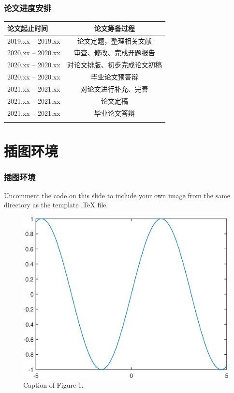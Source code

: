\documentclass[notheorems,11pt,compress]{beamer}
\numberwithin{figure}{section}
\numberwithin{table}{section}
\numberwithin{equation}{section}
\theoremstyle{plain}
\numberwithin{theorem}{section}
\numberwithin{lemma}{section}
\numberwithin{corollary}{section}
\numberwithin{definition}{section}
\numberwithin{proposition}{section}
\theoremstyle{example}
\begin{document}

\begin{frame}
\frametitle{论文进度安排}
\begin{table}[htp!]
\centering
\renewcommand\arraystretch{1.3} %
\begin{tabularx}{0.92\textwidth}{|P{3.2cm}|C|}
\Xhline{2\arrayrulewidth}
论文起止时间       &  论文筹备过程\\
\hline
2019.xx -- 2019.xx    &  论文定题，整理相关文献\\
\hline
2020.xx -- 2020.xx    &  审查、修改、完成开题报告\\
\hline
2020.xx -- 2020.xx   &  对论文排版、初步完成论文初稿\\
\hline
2020.xx -- 2020.xx    &  毕业论文预答辩\\
\hline
2021.xx -- 2021.xx    &  对论文进行补充、完善\\
\hline
2021.xx -- 2021.xx    &  论文定稿\\
\hline
2021.xx -- 2021.xx    &  毕业论文答辩\\
\Xhline{2\arrayrulewidth}
\end{tabularx}
\end{table}

\end{frame}



\section{插图环境}

\begin{frame}
\frametitle{插图环境}

Uncomment the code on this slide to include your own image from the same directory as the template .TeX file.
\begin{figure}[htp!]
\centering
\includegraphics[width=0.5\linewidth]{image1}
\caption{Caption of Figure 1.} \label{fig:A}
\end{figure}
\end{frame}
\end{document}
